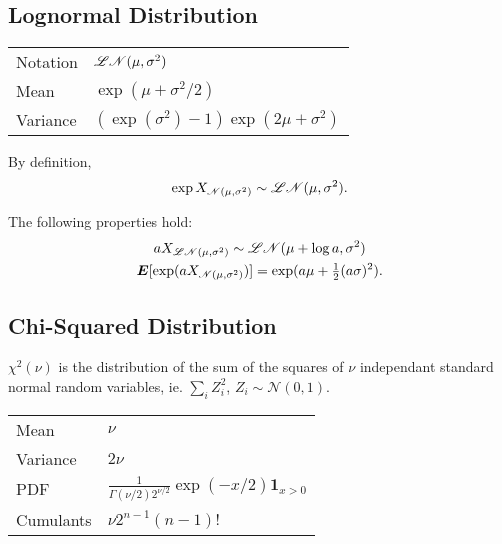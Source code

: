 \subsection{Lognormal Distribution}
\begin{center}
\begin{tabular}{ll}
  \toprule
  Notation & $\mathscr{LN}(\mu,\sigma^2)$\\
  Mean & $\exp(\mu+\sigma^2/2)$\\
  Variance & $(\exp(\sigma^2)-1)\exp(2\mu+\sigma^2)$\\
  \bottomrule
\end{tabular}
\end{center}

\begin{outline}
  \1 By definition,
  \[
    \exp X_{\mathscr{N}(\mu,\sigma^2)} \sim \mathscr{LN}(\mu,\sigma^2).
  \]

  \1 The following properties hold:
  \begin{gather*}
    a X_{\mathscr{LN}(\mu,\sigma^2)} \sim \mathscr{LN}(\mu+\log a,\sigma^2)\\
    \bm E[\exp(aX_{\mathscr{N}(\mu,\sigma^2)})] = \exp(a\mu + \tfrac{1}{2}(a\sigma)^2).
  \end{gather*}

\end{outline}


\subsection{Chi-Squared Distribution}
\begin{outline}
  \1 $\chi^2(\nu)$ is the distribution of the sum of the squares of $\nu$ independant
  standard normal random variables, ie. $\sum_i Z^2_i$, $Z_i\sim\mathscr{N}(0,1)$.

  \1 
  \begin{tabular}{ll} \toprule
    Mean & $\nu$\\
    Variance & $2\nu$\\
    PDF & $\displaystyle \frac{1}{\Gamma(\nu/2)2^{\nu/2}}\exp(-x/2) \bm
          1_{x>0}$\\
    Cumulants & $\nu 2^{n-1}(n-1)!$\\
    \bottomrule
  \end{tabular}
\end{outline}

